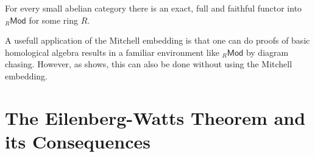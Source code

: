 \begin{theorem}
	For every small abelian category there is an exact, full and faithful functor into $_{R}\mathsf{Mod}$ for some ring $R$.
	\label{thm:mitchell_embedding}
\end{theorem}

A usefull application of the Mitchell embedding is that one can do proofs of basic homological algebra results in a familiar environment like $_{R}\mathsf{Mod}$ by diagram chasing. However, as \cite[202--208]{maclane:categories:1978} shows, this can also be done without using the Mitchell embedding.

\section{The Eilenberg-Watts Theorem and its Consequences}


